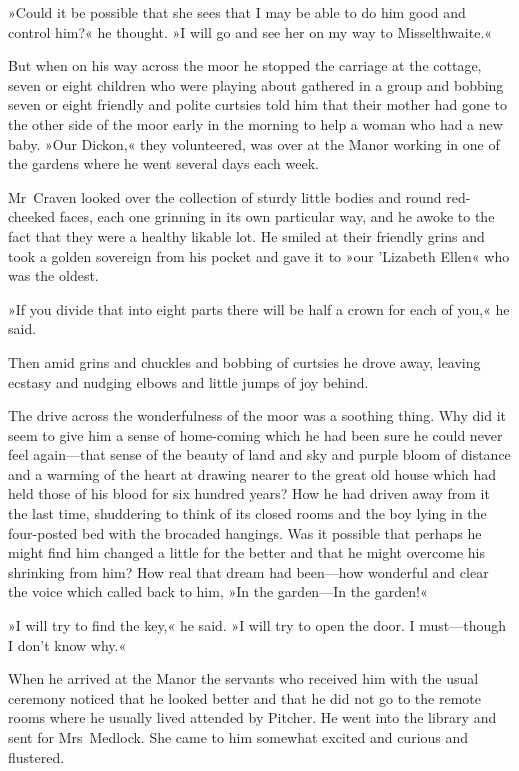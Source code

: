 »Could it be possible that she sees that I may be able to do him good and control him?« he thought. »I will go and see her on my way to Misselthwaite.«

But when on his way across the moor he stopped the carriage at the cottage, seven or eight children who were playing about gathered in a group and bobbing seven or eight friendly and polite curtsies told him that their mother had gone to the other side of the moor early in the morning to help a woman who had a new baby. »Our Dickon,« they volunteered, was over at the Manor working in one of the gardens where he went several days each week.

Mr~Craven looked over the collection of sturdy little bodies and round red-cheeked faces, each one grinning in its own particular way, and he awoke to the fact that they were a healthy likable lot. He smiled at their friendly grins and took a golden sovereign from his pocket and gave it to »our 'Lizabeth Ellen« who was the oldest.

»If you divide that into eight parts there will be half a crown for each of you,« he said.

Then amid grins and chuckles and bobbing of curtsies he drove away, leaving ecstasy and nudging elbows and little jumps of joy behind.

The drive across the wonderfulness of the moor was a soothing thing. Why did it seem to give him a sense of home-coming which he had been sure he could never feel again—that sense of the beauty of land and sky and purple bloom of distance and a warming of the heart at drawing nearer to the great old house which had held those of his blood for six hundred years? How he had driven away from it the last time, shuddering to think of its closed rooms and the boy lying in the four-posted bed with the brocaded hangings. Was it possible that perhaps he might find him changed a little for the better and that he might overcome his shrinking from him? How real that dream had been—how wonderful and clear the voice which called back to him, »In the garden—In the garden!«

»I will try to find the key,« he said. »I will try to open the door. I must—though I don't know why.«

When he arrived at the Manor the servants who received him with the usual ceremony noticed that he looked better and that he did not go to the remote rooms where he usually lived attended by Pitcher. He went into the library and sent for Mrs~Medlock. She came to him somewhat excited and curious and flustered.

